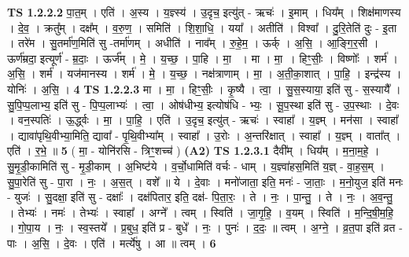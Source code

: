 \documentclass[17pt]{extarticle}
\begin{document}
                  \newline
                                \textbf{ TS 1.2.2.2} \newline
                  पा॒त॒म् । एति॑ । अ॒स्य । य॒ज्ञ्स्य॑ । उ॒दृच॒ इत्यु॑त् - ऋचः॑ । इ॒माम् । धिय᳚म् । शिक्ष॑माणस्य । दे॒व॒ । क्रतु᳚म् । दक्ष᳚म् । व॒रु॒ण॒ । समिति॑ । शि॒शा॒धि॒ । यया᳚ । अतीति॑ । विश्वा᳚ । दु॒रि॒तेति॑ दुः - इ॒ता । तरे॑म । सु॒तर्मा॑ण॒मिति॑ सु -तर्मा॑णम् । अधीति॑ । नाव᳚म् । रु॒हे॒म॒ । ऊर्क् । अ॒सि॒ । आ॒ङ्गि॒र॒सी । ऊर्ण॑म्रदा॒ इत्यूर्ण॑ - म्र॒दाः॒ । ऊर्ज᳚म् । मे॒ । य॒च्छ॒ । पा॒हि । मा॒  । मा । मा॒ । हिꣳ॒॒सीः॒ । विष्णोः᳚ । शर्म॑ । अ॒सि॒ । शर्म॑ । यज॑मानस्य । शर्म॑ । मे॒ । य॒च्छ॒ । नक्ष॑त्राणाम् । मा॒ । अ॒ती॒का॒शात् । पा॒हि॒ । इन्द्र॑स्य । योनिः॑ । अ॒सि॒ । \textbf{  4} \newline
                  \newline
                                \textbf{ TS 1.2.2.3} \newline
                  मा । मा॒ । हिꣳ॒॒सीः॒ । कृ॒ष्यै । त्वा॒ । सु॒स॒स्याया॒ इति॑ सु - स॒स्यायै᳚ । सु॒पि॒प्प॒लाभ्य॒ इति॑ सु - पि॒प्प॒लाभ्यः॑ । त्वा॒ । ओष॑धीभ्य॒ इत्योष॑धि - भ्यः॒ । सू॒प॒स्था इति॑ सु - उ॒प॒स्थाः । दे॒वः । वन॒स्पतिः॑ । ऊ॒र्द्ध्वः । मा॒ । पा॒हि॒ । एति॑ । उ॒दृच॒ इत्यु॑त् - ऋचः॑ । स्वाहा᳚ । य॒ज्ञ्म् । मन॑सा । स्वाहा᳚ । द्यावा॑पृथि॒वीभ्या॒मिति॒ द्यावा᳚ - पृ॒थि॒वीभ्या᳚म् । स्वाहा᳚ । उ॒रोः । अ॒न्तरि॑क्षात् । स्वाहा᳚ । य॒ज्ञ्म् । वाता᳚त् । एति॑ । र॒भे॒ ॥ \textbf{  5 } \newline
                  \newline
                      ( मा॒ - योनि॑रसि - त्रिꣳ॒॒शच्च॑ )  \textbf{(A2)} \newline \newline
                                \textbf{ TS 1.2.3.1} \newline
                  दैवी᳚म् । धिय᳚म् । म॒ना॒म॒हे॒ । सु॒मृ॒डी॒कामिति॑ सु - मृ॒डी॒काम् । अ॒भिष्ट॑ये । व॒र्चो॒धामिति॑ वर्चः - धाम् । य॒ज्ञ्वा॑हस॒मिति॑ य॒ज्ञ् - वा॒ह॒स॒म् । सु॒पा॒रेति॑ सु - पा॒रा । नः॒ । अ॒स॒त् । वशे᳚ ॥ ये । दे॒वाः । मनो॑जाता॒ इति॒ मनः॑ - जा॒ताः॒ । म॒नो॒युज॒ इति॑ मनः - युजः॑ । सु॒दक्षा॒ इति॑ सु - दक्षाः᳚ । दक्ष॑पितार॒ इति॒ दक्ष॑- पि॒ता॒रः॒ । ते । नः॒ । पा॒न्तु॒ । ते । नः॒ । अ॒व॒न्तु॒ । तेभ्यः॑ । नमः॑ । तेभ्यः॑ । स्वाहा᳚ । अग्ने᳚ । त्वम् । स्विति॑ । जा॒गृ॒हि॒ । व॒यम् । स्विति॑ । म॒न्दि॒षी॒म॒हि॒ । गो॒पा॒य । नः॒ । स्व॒स्तये᳚ । प्र॒बुध॒ इति॑ प्र - बुधे᳚ । नः॒ । पुनः॑ । द॒दः॒ ॥ त्वम् । अ॒ग्ने॒ । व्र॒त॒पा इति॑ व्रत - पाः । अ॒सि॒ । दे॒वः । एति॑ । मर्त्ये॑षु । आ ॥ त्वम् । \textbf{  6} \newline
                  \newline
\end{document}
